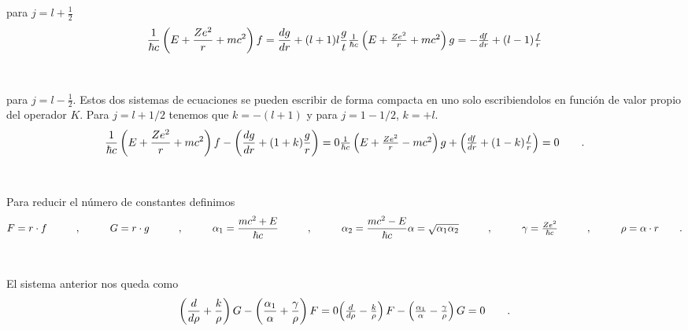 \documentclass[11pt,letterpaper]{article}     %
\begin{document}
para $j=l+\frac{1}{2}$
\begin{equation} \label{eq:92}
\frac{1}{\hbar c}\left(E + \frac{Ze^2}{r} + mc^2 \right) f = \frac{d g}{dr} +(l+1) l \frac{g}{t} $$\\$$
\frac{1}{\hbar c} \left( E + \frac{Z e^2}{r} + mc^2\right)g = - \frac{df}{dr} + (l-1) \frac{f}{r}
\end{equation} \\ \\
para $j=l-\frac{1}{2}$. Estos dos sistemas de ecuaciones se pueden escribir de forma compacta en uno solo escribiendolos en función de valor propio del operador $K$. Para $j=l+1/2$ tenemos que $k=-(l+1)$ y para $j=1-1/2$, $k=+l$.
\begin{equation} \label{eq:93}
\frac{1}{\hbar c}\left(E + \frac{Ze^2}{r} + mc^2 \right) f - \left( \frac{dg}{dr} + (1+k) \frac{g}{r}\right)=0 $$\\$$
\frac{1}{\hbar c}\left(E + \frac{Ze^2}{r} - mc^2 \right) g + \left(\frac{df}{dr} + (1-k) \frac{f}{r} \right)=0 \qquad .
\end{equation} \\ \\
Para reducir el número de constantes definimos
\begin{equation} \label{eq:94}
F=r \cdot f \hspace{1cm}, \hspace{1cm} G= r \cdot g \hspace{1cm}, \hspace{1cm} \alpha_1=\frac{mc^2 + E}{\hbar c} \hspace{1cm}, \hspace{1cm} \alpha_2=\frac{mc^2-E}{\hbar c} $$\\$$
\alpha=\sqrt{\alpha_1 \alpha_2} \hspace{1cm}, \hspace{1cm} \gamma=\frac{Ze^2}{\hbar c} \hspace{1cm}, \hspace{1cm} \rho= \alpha \cdot r \qquad .
\end{equation} \\ \\
El sistema anterior nos queda como
\begin{equation} \label{eq:95}
\left( \frac{d}{d \rho} + \frac{k}{\rho}\right)G - \left( \frac{\alpha_1}{\alpha} + \frac{\gamma}{\rho}\right)F=0 $$\\$$
\left( \frac{d}{d \rho} - \frac{k}{\rho}\right)F - \left( \frac{\alpha_1}{\alpha} - \frac{\gamma}{\rho}\right)G=0 \qquad.
\end{equation} \\ \\
\end{document}
